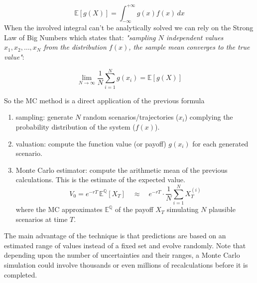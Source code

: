 $$\mathbb{E}[g(X)] = \int_{-\infty}^{+\infty} g(x) f(x) \, dx$$
When the involved integral can't be analytically solved we can rely on the Strong Law of Big Numbers which states that: \textit{"sampling $N$ independent values $x_1, x_2, \dots, x_N$ from the distribution $f(x)$, the sample mean converges to the true value"}:

$$\lim_{N \to \infty} \frac{1}{N} \sum_{i=1}^{N} g(x_i) = \mathbb{E}[g(X)]$$

So the MC method is a direct application of the previous formula
\begin{enumerate}
	\item sampling: generate $N$ random scenarios/trajectories ($x_i$) complying the probability distribution of the system ($f(x)$).
	\item valuation: compute the function value (or payoff) $g(x_i)$ for each generated scenario.
	\item Monte Carlo estimator: compute the arithmetic mean of the previous calculations. This is the estimate of the expected value.
$$V_0 = e^{-rT} \, \mathbb{E}^{\mathbb{Q}}[X_T] \quad \approx \quad e^{-rT} \cdot \frac{1}{N} \sum_{i=1}^{N} X_T^{(i)}$$
where the MC approximates $\mathbb{E}^{\mathbb{Q}}$ of the payoff $X_T$ simulating $N$ plausible scenarios at time $T$.
\end{enumerate}


The main advantage of the technique is that predictions are based on an estimated range of values instead of a fixed set and evolve randomly.
Note that depending upon the number of uncertainties and their ranges, a Monte Carlo simulation could involve thousands or even millions of recalculations before it is completed.
%
%

